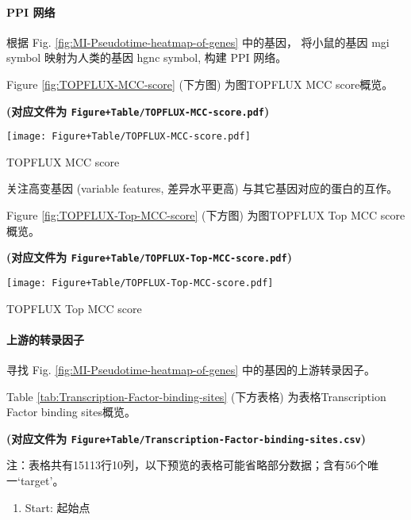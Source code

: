 \documentclass[
]{article}
\providecommand{\tightlist}{%
  \setlength{\itemsep}{0pt}\setlength{\parskip}{0pt}}
\begin{document}
\hypertarget{ppi-ux7f51ux7edc}{%
\paragraph{PPI 网络}\label{ppi-ux7f51ux7edc}}

根据 Fig. \ref{fig:MI-Pseudotime-heatmap-of-genes} 中的基因，
将小鼠的基因 mgi symbol 映射为人类的基因 hgnc symbol,
构建 PPI 网络。

Figure \ref{fig:TOPFLUX-MCC-score} (下方图) 为图TOPFLUX MCC score概览。

\textbf{(对应文件为 \texttt{Figure+Table/TOPFLUX-MCC-score.pdf})}

\def\@captype{figure}
\begin{center}
\texttt{[image: Figure+Table/TOPFLUX-MCC-score.pdf]}
\caption{TOPFLUX MCC score}\label{fig:TOPFLUX-MCC-score}
\end{center}

关注高变基因 (variable features, 差异水平更高) 与其它基因对应的蛋白的互作。

Figure \ref{fig:TOPFLUX-Top-MCC-score} (下方图) 为图TOPFLUX Top MCC score概览。

\textbf{(对应文件为 \texttt{Figure+Table/TOPFLUX-Top-MCC-score.pdf})}

\def\@captype{figure}
\begin{center}
\texttt{[image: Figure+Table/TOPFLUX-Top-MCC-score.pdf]}
\caption{TOPFLUX Top MCC score}\label{fig:TOPFLUX-Top-MCC-score}
\end{center}

\hypertarget{ux4e0aux6e38ux7684ux8f6cux5f55ux56e0ux5b50}{%
\paragraph{上游的转录因子}\label{ux4e0aux6e38ux7684ux8f6cux5f55ux56e0ux5b50}}

寻找 Fig. \ref{fig:MI-Pseudotime-heatmap-of-genes} 中的基因的上游转录因子。

Table \ref{tab:Transcription-Factor-binding-sites} (下方表格) 为表格Transcription Factor binding sites概览。

\textbf{(对应文件为 \texttt{Figure+Table/Transcription-Factor-binding-sites.csv})}

\begin{center}\begin{tcolorbox}[colback=gray!10, colframe=gray!50, width=0.9\linewidth, arc=1mm, boxrule=0.5pt]注：表格共有15113行10列，以下预览的表格可能省略部分数据；含有56个唯一`target'。
\end{tcolorbox}
\end{center}
\begin{center}\begin{tcolorbox}[colback=gray!10, colframe=gray!50, width=0.9\linewidth, arc=1mm, boxrule=0.5pt]\begin{enumerate}\tightlist
\item Start:  起始点
\end{enumerate}\end{tcolorbox}
\end{center}
\end{document}
